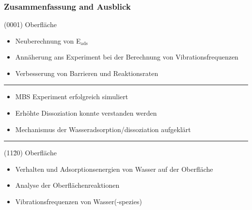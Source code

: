 \documentclass[hyperref={pdfpagelabels=false}]{beamer}
\begin{document}
\begin{frame}
\begin{columns}
\begin{center}
 \end{center}
 \end{columns}
 \newline~\newline~\newline
{}
\end{frame}


\section*{}
\begin{frame}
 \frametitle{Zusammenfassung and Ausblick}
 {\color{blue}(0001) Oberfläche}
\begin{itemize}
 \item Neuberechnung von E$_{\textrm{ads}}$ 
 \item Annäherung ans Experiment bei der Berechnung von Vibrationsfrequenzen
 \item Verbesserung von Barrieren und Reaktionsraten
\end{itemize}
 \pause\hrule
\begin{itemize}
 \item MBS Experiment erfolgreich simuliert
 \item Erhöhte Dissoziation konnte verstanden werden
 \item Mechanismus der Wasseradsorption/dissoziation aufgeklärt
\end{itemize}
 \pause\hrule
 {\color{blue}(11\=20) Oberfläche}
\begin{itemize}
 \item Verhalten und Adsorptionsenergien von Wasser auf der Oberfläche
 \item Analyse der Oberflächenreaktionen
 \item Vibrationsfrequenzen von Wasser(-spezies)
\end{itemize}
 \end{frame}
\end{document}
